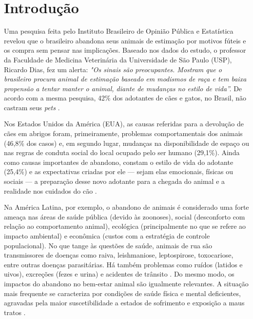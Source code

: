 \documentclass[portuguese]{textolivre}
\begin{document}
\begin{polyabstract}
\begin{english}
\begin{abstract}
\end{abstract}
\end{english}
\end{polyabstract}

\section{Introdução}\label{sec-intro}
Uma pesquisa feita pelo Instituto Brasileiro de Opinião Pública e Estatística \textcite{IBOPE} revelou que o brasileiro abandona seus animais de estimação por motivos fúteis e os compra sem pensar nas implicações. Baseado nos dados do estudo, o professor da Faculdade de Medicina Veterinária da Universidade de São Paulo (USP), Ricardo Dias, fez um alerta: \textit {"Os sinais são preocupantes. Mostram que o brasileiro procura animal de estimação baseado em modismos de raça e tem baixa propensão a tentar manter o animal, diante de mudanças no estilo de vida”.} De acordo com a mesma pesquisa, 42\% dos adotantes de cães e gatos, no Brasil, não castram seus \textit{pets} \cite{RECMVZ16221}. 

Nos Estados Unidos da América (EUA), as causas referidas para a devolução de cães em abrigos foram, primeiramente, problemas comportamentais dos animais (46,8\% dos casos) e, em segundo lugar, mudanças na disponibilidade de espaço ou nas regras de conduta social do local ocupado pelo ser humano (29,1\%). Ainda como causas importantes de abandono, constam o estilo de vida do adotante (25,4\%) e as expectativas criadas por ele — sejam elas emocionais, físicas ou sociais — a preparação desse novo adotante para a chegada do animal e a realidade nos cuidados do cão \cite{RECMVZ16221}.

Na América Latina, por exemplo, o abandono de animais é considerado uma forte ameaça nas áreas de saúde pública (devido às zoonoses), social (desconforto com relação ao comportamento animal), ecológica (principalmente no que se refere ao impacto ambiental) e econômica (custos com a estratégia de controle populacional). No que tange às questões de saúde, animais de rua são transmissores de doenças como raiva, leishmaniose, leptospirose, toxocariose, entre outras doenças parasitárias. Há também problemas como ruídos (latidos e uivos), excreções (fezes e urina) e acidentes de trânsito \cite{RECMVZ16221}.
Do mesmo modo, os impactos do abandono no bem-estar animal são igualmente relevantes. A situação mais frequente se caracteriza por condições de saúde física e mental deficientes, agravadas pela maior suscetibilidade a estados de sofrimento e exposição a maus tratos \cite{Stafford2007}.
\end{document}
